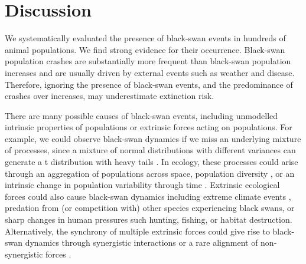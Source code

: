 \section{Discussion}

We systematically evaluated the presence of black-swan events in hundreds of
animal populations. We find strong evidence for their occurrence. Black-swan
population crashes are substantially more frequent than black-swan population
increases and are usually driven by external events such as weather and
disease. Therefore, ignoring the presence of black-swan events, and the
predominance of crashes over increases, may underestimate extinction risk.

There are many possible causes of black-swan events, including
unmodelled intrinsic properties of populations or extrinsic forces acting on
populations. For example, we could observe black-swan dynamics if we miss an
underlying mixture of processes, since a mixture of normal distributions with
different variances can generate a t distribution with heavy
tails \citep{allen2001}. In ecology, these processes could arise through an
aggregation of populations across space, population
diversity \citep{schindler2010}, or an intrinsic change in population variability
through time \citep{carpenter2006}. Extrinsic ecological forces could also cause
black-swan dynamics \citep{nunez2012} including extreme climate
events \citep{meehl2004, katz2005, ipcc2012}, predation from (or competition
with) other species experiencing black swans, or sharp changes in human
pressures such hunting, fishing, or habitat destruction. Alternatively, the
synchrony of multiple extrinsic forces could give rise to black-swan dynamics
through synergistic interactions \citep{kirby2009} or a rare alignment of
non-synergistic forces \citep{denny2009}.

